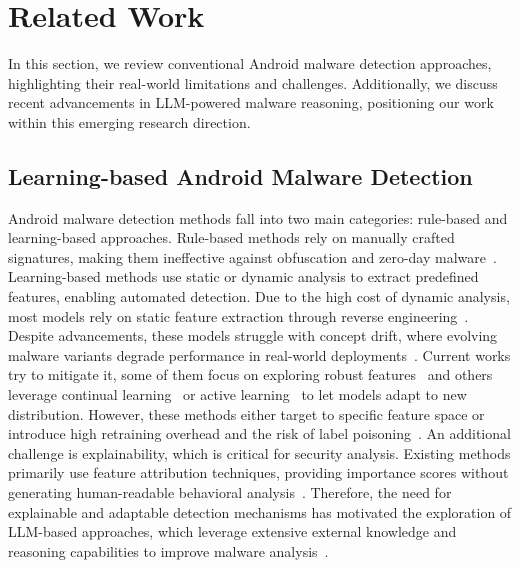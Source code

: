 \section{Related Work}
In this section, we review conventional Android malware detection approaches, highlighting their real-world limitations and challenges. Additionally, we discuss recent advancements in LLM-powered malware reasoning, positioning our work within this emerging research direction.

\subsection{Learning-based Android Malware Detection}
Android malware detection methods fall into two main categories: rule-based and learning-based approaches. Rule-based methods rely on manually crafted signatures, making them ineffective against obfuscation and zero-day malware~\cite{unraveling}. 
Learning-based methods use static or dynamic analysis to extract predefined features, enabling automated detection. Due to the high cost of dynamic analysis, most models rely on static feature extraction through reverse engineering~\cite{Arpdrebin, Grossedeepdrebin}. Despite advancements, these models struggle with concept drift, where evolving malware variants degrade performance in real-world deployments~\cite{transcend, transcending}. Current works try to mitigate it, some of them focus on exploring robust features~\cite{scrr,damo,svm_ce,apigraph} and others leverage continual learning~\cite{continuous, tesseract,malware_evolution_update} or active learning~\cite{droidevolver, online_mal} to let models adapt to new distribution. However, these methods either target to specific feature space or introduce high retraining overhead and the risk of label poisoning~\cite{recda, labelless}. An additional challenge is explainability, which is critical for security analysis. Existing methods primarily use feature attribution techniques, providing importance scores without generating human-readable behavioral analysis~\cite{finer, belaid}. Therefore, the need for explainable and adaptable detection mechanisms has motivated the exploration of LLM-based approaches, which leverage extensive external knowledge and reasoning capabilities to improve malware analysis~\cite{code_explain,code_explain_2}.


